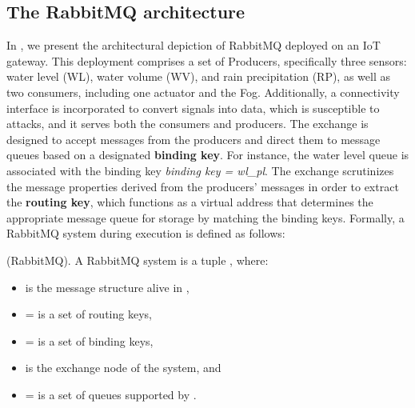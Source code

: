 \subsection{The RabbitMQ architecture}


In , we present the architectural depiction of RabbitMQ deployed on an IoT gateway. This deployment comprises a set of Producers, specifically three sensors: water level (WL), water volume (WV), and rain precipitation (RP), as well as two consumers, including one actuator and the Fog. Additionally, a connectivity interface is incorporated to convert signals into data, which is susceptible to attacks, and it serves both the consumers and producers. The exchange is designed to accept messages from the producers and direct them to message queues based on a designated \textbf{binding key}. For instance, the water level queue is associated with the binding key \emph{binding key = wl\_pl}. The exchange scrutinizes the message properties derived from the producers' messages in order to extract the \textbf{routing key}, which functions as a virtual address that determines the appropriate message queue for storage by matching the binding keys. Formally, a RabbitMQ system during execution is defined as follows:

\begin{mydef} \label{def:rq} \normalfont (RabbitMQ). A RabbitMQ system  is a tuple , where: 
 \begin{itemize}
\item {} is the message structure alive in , 
\item {}=  is a set of routing keys,
\item {}=  is a set of binding keys,
\item {} is the exchange node of the system, and 
\item {} =  is a set of queues supported by . 
            \end{itemize}
\end{mydef}


